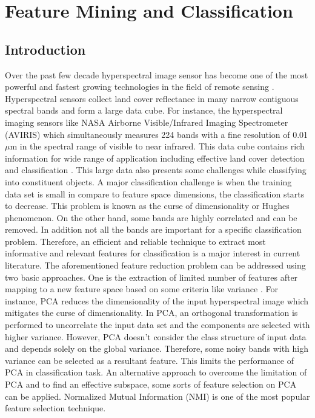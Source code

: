 \documentclass[document.tex]{subfiles}
\begin{document}
\chapter{Feature Mining and Classification}
\section{Introduction}
\noindent Over the past few decade hyperspectral image sensor
has become one of the most powerful and fastest growing technologies in the field of remote sensing \cite{3}. Hyperspectral sensors collect land cover reflectance in many narrow contiguous spectral bands and form a large data cube\cite{3}. For instance, the hyperspectral imaging sensors like NASA Airborne Visible/Infrared Imaging
Spectrometer (AVIRIS) which simultaneously measures 224 bands with a fine resolution of 0.01 $\mu$m in the spectral range of visible to near infrared. This data cube contains rich information for wide range of application including effective land cover detection and classification \cite{24}. This large data also presents some challenges while classifying into constituent objects. A major classification challenge is when the training data set is small in compare to feature space dimensions, the classification starts to decrease. This problem is known as the curse of dimensionality or Hughes phenomenon\cite{4}\cite{25}\cite{26}. On the other hand, some bands are highly correlated and can be removed. In addition not all the bands are important for a specific classification problem. Therefore, an efficient and reliable technique to extract most informative and relevant features for classification is a major interest in current literature. The aforementioned feature reduction problem can be addressed using two basic approaches\cite{2}. One is the extraction of limited number of features after mapping to a new feature space based on some criteria like variance \cite{27,28}\cite{8}\cite{7}. For instance, PCA reduces the dimensionality of the input hyperspectral image which mitigates the curse of dimensionality. In PCA, an orthogonal transformation is performed to uncorrelate the input data set and the components are selected with higher variance. However, PCA doesn't consider the class structure of input data and depends solely on the global variance. Therefore, some noisy bands with high variance can be selected as a resultant feature. This limits the performance of PCA in classification task. An alternative approach to overcome the limitation of PCA and to find an effective subspace, some sorts of feature selection on PCA can be applied\cite{34}. Normalized Mutual Information (NMI) is one of the most popular feature selection technique\cite{9,10,20}.\\
\end{document}
